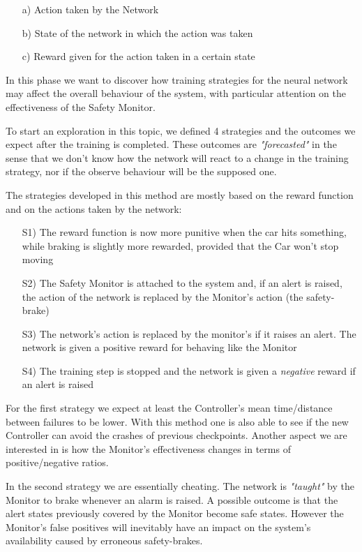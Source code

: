 \begin{itemize}
	\item[a)] Action taken by the Network
	\item[b)] State of the network in which the action was taken
	\item[c)] Reward given for the action taken in a certain state
\end{itemize}

In this phase we want to discover how training strategies for the neural network may affect the overall behaviour of the system, with particular attention on the effectiveness of the Safety Monitor.

To start an exploration in this topic, we defined 4 strategies and the outcomes we expect after the training is completed. These outcomes are \textsl{"forecasted"} in the sense that we don't know how the network will react to a change in the training strategy, nor if the observe behaviour will be the supposed one.

The strategies developed in this method are mostly based on the reward function and on the actions taken by the network:

\begin{itemize}
	\item[S1)] The reward function is now more punitive when the car hits something, while braking is slightly more rewarded, provided that the Car won't stop moving
	\item[S2)] The Safety Monitor is attached to the system and, if an alert is raised, the action of the network is replaced by the Monitor's action (the safety-brake)
	\item[S3)] The network's action is replaced by the monitor's if it raises an alert. The network is given a positive reward for behaving like the Monitor
	\item[S4)] The training step is stopped and the network is given a \textsl{negative} reward if an alert is raised
\end{itemize}

For the first strategy we expect at least the Controller's mean time/distance between failures to be lower. With this method one is also able to see if the new Controller can avoid the crashes of previous checkpoints. Another aspect we are interested in is how the Monitor's effectiveness changes in terms of positive/negative ratios.

In the second strategy we are essentially cheating. The network is \textsl{"taught"} by the Monitor to brake whenever an alarm is raised. A possible outcome is that the alert states previously covered by the Monitor become safe states. However the Monitor's false positives will inevitably have an impact on the system's availability caused by erroneous safety-brakes.

